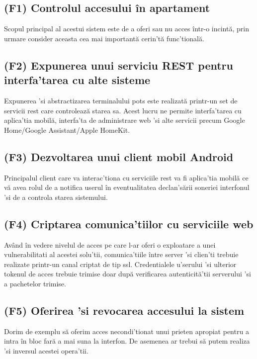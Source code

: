 \subsection{(F1) Controlul accesului în apartament}

Scopul principal al acestui sistem este de a oferi sau nu acces într-o incintă, prin urmare consider aceasta cea mai importantă cerin'tă func'tională.

\subsection{(F2) Expunerea unui serviciu REST pentru interfa'tarea cu alte sisteme}

Expunerea 'si abstractizarea terminalului \acrshort{pots} este realizată printr-un set de servicii \acrfull{rest} care controlează starea sa. Acest lucru ne permite interfa'tarea cu aplica'tia mobilă, interfa'ta de administrare web 'si alte servicii precum Google Home/Google Assistant/Apple HomeKit.

\subsection{(F3) Dezvoltarea unui client mobil Android}

Principalul client care va interac'tiona cu serviciile \acrshort{rest} va fi aplica'tia mobilă ce vă avea rolul de a notifica userul în eventualitatea declan'sării soneriei interfonul 'si de a controla starea sistemului.

\subsection{(F4) Criptarea comunica'tiilor cu serviciile web}

Având în vedere nivelul de acces pe care l-ar oferi o exploatare a unei vulnerabilitati al acestei solu'tii, comunica'tiile între server 'si clien'ti trebuie realizate printr-un canal criptat de tip \acrfull{ssl}. Credentialele u'serului 'si ulterior tokenul de acces trebuie trimise doar după verificarea autenticită'tii serverului 'si a pachetelor trimise.

\subsection{(F5) Oferirea 'si revocarea accesului la sistem}

Dorim de exemplu să oferim acces necondi'tionat unui prieten apropiat pentru a intra în bloc fară a mai suna la interfon. De asemenea ar trebui să putem realiza 'si inversul acestei opera'tii.


